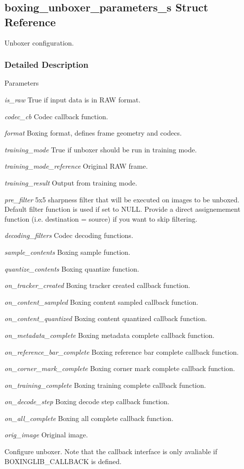 \hypertarget{structboxing__unboxer__parameters__s}{
\subsection{boxing\_\-unboxer\_\-parameters\_\-s Struct Reference}
\label{structboxing__unboxer__parameters__s}
}


Unboxer configuration.  


\subsubsection{Detailed Description}

\begin{DoxyParams}{Parameters}
\item[{\em is\_\-raw}]True if input data is in RAW format. \item[{\em codec\_\-cb}]Codec callback function. \item[{\em format}]Boxing format, defines frame geometry and codecs. \item[{\em training\_\-mode}]True if unboxer should be run in training mode. \item[{\em training\_\-mode\_\-reference}]Original RAW frame. \item[{\em training\_\-result}]Output from training mode. \item[{\em pre\_\-filter}]5x5 sharpness filter that will be executed on images to be unboxed. Default filter function is used if set to NULL. Provide a direct assignemement function (i.e. destination = source) if you want to skip filtering. \item[{\em decoding\_\-filters}]Codec decoding functions. \item[{\em sample\_\-contents}]Boxing sample function. \item[{\em quantize\_\-contents}]Boxing quantize function. \item[{\em on\_\-tracker\_\-created}]Boxing tracker created callback function. \item[{\em on\_\-content\_\-sampled}]Boxing content sampled callback function. \item[{\em on\_\-content\_\-quantized}]Boxing content quantized callback function. \item[{\em on\_\-metadata\_\-complete}]Boxing metadata complete callback function. \item[{\em on\_\-reference\_\-bar\_\-complete}]Boxing reference bar complete callback function. \item[{\em on\_\-corner\_\-mark\_\-complete}]Boxing corner mark complete callback function. \item[{\em on\_\-training\_\-complete}]Boxing training complete callback function. \item[{\em on\_\-decode\_\-step}]Boxing decode step callback function. \item[{\em on\_\-all\_\-complete}]Boxing all complete callback function. \item[{\em orig\_\-image}]Original image.\end{DoxyParams}
Configure unboxer. Note that the callback interface is only avaliable if BOXINGLIB\_\-CALLBACK is defined.

